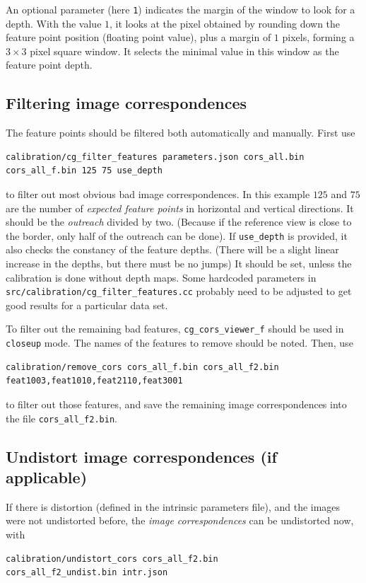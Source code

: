 \documentclass[11pt]{scrreprt}
\begin{document}
An optional parameter (here \texttt{1}) indicates the margin of the window to look for a depth. With the value $1$, it looks at the pixel obtained by rounding down the feature point position (floating point value), plus a margin of $1$ pixels, forming a $3 \times 3$ pixel square window. It selects the minimal value in this window as the feature point depth.


\subsection{Filtering image correspondences}
The feature points should be filtered both automatically and manually.
First use
\begin{lstlisting}[language=bash]
calibration/cg_filter_features parameters.json cors_all.bin
cors_all_f.bin 125 75 use_depth
\end{lstlisting}
to filter out most obvious bad image correspondences. In this example $125$ and $75$ are the number of \emph{expected feature points} in horizontal and vertical directions. It should be the \emph{outreach} divided by two. (Because if the reference view is close to the border, only half of the outreach can be done). If \texttt{use\_depth} is provided, it also checks the constancy of the feature depths. (There will be a slight linear increase in the depths, but there must be no jumps) It should be set, unless the calibration is done without depth maps. Some hardcoded parameters in \texttt{src/calibration/cg\_filter\_features.cc} probably need to be adjusted to get good results for a particular data set.

To filter out the remaining bad features, \texttt{cg\_cors\_viewer\_f} should be used in \texttt{closeup} mode. The names of the features to remove should be noted. Then, use
\begin{lstlisting}[language=bash]
calibration/remove_cors cors_all_f.bin cors_all_f2.bin 
feat1003,feat1010,feat2110,feat3001
\end{lstlisting}
to filter out those features, and save the remaining image correspondences into the file \texttt{cors\_all\_f2.bin}.


\subsection{Undistort image correspondences (if applicable)}
If there is distortion (defined in the intrinsic parameters file), and the images were not undistorted before, the \emph{image correspondences} can be undistorted now, with
\begin{lstlisting}[language=bash]
calibration/undistort_cors cors_all_f2.bin
cors_all_f2_undist.bin intr.json
\end{lstlisting}
\end{document}
